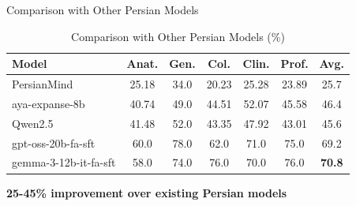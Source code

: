 \begin{frame}{Comparison with Other Persian Models}
    \begin{table}[h]
        \centering
        \small
        \caption{Comparison with Other Persian Models (\%)}
        \begin{tabular}{l|ccccc|c}
            \toprule
            \textbf{Model} & \textbf{Anat.} & \textbf{Gen.} & \textbf{Col.} & \textbf{Clin.} & \textbf{Prof.} & \textbf{Avg.} \\
            \midrule
            PersianMind & 25.18 & 34.0 & 20.23 & 25.28 & 23.89 & 25.7 \\
            aya-expanse-8b & 40.74 & 49.0 & 44.51 & 52.07 & 45.58 & 46.4 \\
            Qwen2.5 & 41.48 & 52.0 & 43.35 & 47.92 & 43.01 & 45.6 \\
            gpt-oss-20b-fa-sft & 60.0 & 78.0 & 62.0 & 71.0 & 75.0 & 69.2 \\
            \rowcolor{improvement!20} gemma-3-12b-it-fa-sft & 58.0 & 74.0 & 76.0 & 70.0 & 76.0 & \textbf{70.8} \\
            \bottomrule
        \end{tabular}
    \end{table}
    
    \begin{center}
        \colorbox{improvement!20}{\textbf{25-45\% improvement over existing Persian models}}
    \end{center}
\end{frame}

